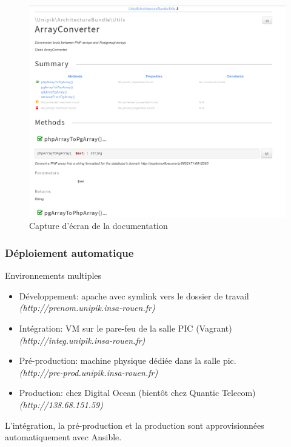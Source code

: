 \begin{frame}
      \begin{figure}[r]
		\includegraphics[scale=0.2]{images/doc.png}
		\caption{Capture d'écran de la documentation}
	  \end{figure}
\end{frame}

\begin{frame}
\frametitle{Déploiement automatique}
\begin{block}{Environnements multiples}
	\begin{itemize}
		\item Développement: apache avec symlink vers le dossier de travail \\
		\emph{\tiny(http://prenom.unipik.insa-rouen.fr)}
		\item Intégration: VM sur le pare-feu de la salle PIC (Vagrant) \\
		\emph{\tiny(http://integ.unipik.insa-rouen.fr)}
		\item Pré-production: machine physique dédiée dans la salle pic. \\
		\emph{\tiny(http://pre-prod.unipik.insa-rouen.fr)}
		\item Production: chez Digital Ocean (bientôt chez Quantic Telecom) \\
		\emph{\tiny(http://138.68.151.59)}
	\end{itemize}
\end{block}

L'intégration, la pré-production et la production sont approvisionnées automatiquement avec Ansible.

\end{frame}
